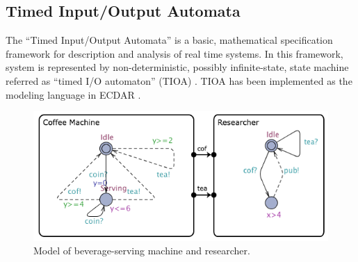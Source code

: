 \subsection{Timed Input/Output Automata}
\label{background-tioa}

The ``Timed Input/Output Automata'' is a basic, mathematical specification
framework for description and analysis of real time systems.  In this framework,
system is represented by non-deterministic, possibly infinite-state, state
machine referred as “timed I/O automaton” (TIOA)
\cite{Kaynar:2006:TTI:1203437}. TIOA has been implemented as the modeling
language in ECDAR \cite{conf/atva/DavidLLNW10}.

\begin{figure}[t]
\label{simple-model}
\begin{centering}
\includegraphics[scale=0.6]{images/simplefied_uni}
\par\end{centering}
\caption{Model of beverage-serving machine and researcher.}
\label{bev-machine}
\end{figure}

